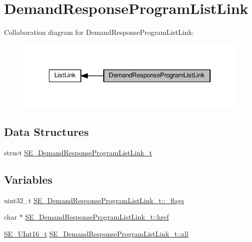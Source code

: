 \hypertarget{group__DemandResponseProgramListLink}{}\section{Demand\+Response\+Program\+List\+Link}
\label{group__DemandResponseProgramListLink}
Collaboration diagram for Demand\+Response\+Program\+List\+Link\+:\nopagebreak
\begin{figure}[H]
\begin{center}
\leavevmode
\includegraphics[width=334pt]{group__DemandResponseProgramListLink}
\end{center}
\end{figure}
\subsection*{Data Structures}
\begin{DoxyCompactItemize}
\item 
struct \hyperlink{structSE__DemandResponseProgramListLink__t}{S\+E\+\_\+\+Demand\+Response\+Program\+List\+Link\+\_\+t}
\end{DoxyCompactItemize}
\subsection*{Variables}
\begin{DoxyCompactItemize}
\item 
uint32\+\_\+t \hyperlink{group__DemandResponseProgramListLink_ga5b5cab052676a036ef40ecca31c6593f}{S\+E\+\_\+\+Demand\+Response\+Program\+List\+Link\+\_\+t\+::\+\_\+flags}
\item 
char $\ast$ \hyperlink{group__DemandResponseProgramListLink_gaf28f0224cca8a7b18332791bff9195aa}{S\+E\+\_\+\+Demand\+Response\+Program\+List\+Link\+\_\+t\+::href}
\item 
\hyperlink{group__UInt16_gac68d541f189538bfd30cfaa712d20d29}{S\+E\+\_\+\+U\+Int16\+\_\+t} \hyperlink{group__DemandResponseProgramListLink_ga6905718c355c3790f83656fc77826b20}{S\+E\+\_\+\+Demand\+Response\+Program\+List\+Link\+\_\+t\+::all}
\end{DoxyCompactItemize}


